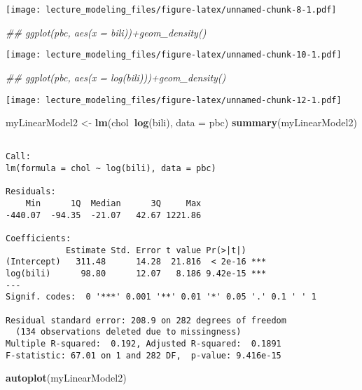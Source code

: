 \documentclass[12pt,letterpaperpaper,openany]{book}
\newenvironment{Shaded}{\begin{snugshade}}{\end{snugshade}}
\newcommand{\CommentTok}[1]{\textcolor[rgb]{0.56,0.35,0.01}{\textit{#1}}}
\newcommand{\DataTypeTok}[1]{\textcolor[rgb]{0.13,0.29,0.53}{#1}}
\newcommand{\KeywordTok}[1]{\textcolor[rgb]{0.13,0.29,0.53}{\textbf{#1}}}
\newcommand{\NormalTok}[1]{#1}
\newcommand{\OperatorTok}[1]{\textcolor[rgb]{0.81,0.36,0.00}{\textbf{#1}}}
\newcommand{\StringTok}[1]{\textcolor[rgb]{0.31,0.60,0.02}{#1}}
\begin{document}
\texttt{[image: lecture\_modeling\_files/figure-latex/unnamed-chunk-8-1.pdf]}

\begin{Shaded}
\begin{Highlighting}[]
\CommentTok{## ggplot(pbc, aes(x = bili))+geom_density()}
\end{Highlighting}
\end{Shaded}

\texttt{[image: lecture\_modeling\_files/figure-latex/unnamed-chunk-10-1.pdf]}

\begin{Shaded}
\begin{Highlighting}[]
\CommentTok{## ggplot(pbc, aes(x = log(bili)))+geom_density()}
\end{Highlighting}
\end{Shaded}

\texttt{[image: lecture\_modeling\_files/figure-latex/unnamed-chunk-12-1.pdf]}

\begin{Shaded}
\begin{Highlighting}[]
\NormalTok{myLinearModel2 <-}\StringTok{ }\KeywordTok{lm}\NormalTok{(chol}\OperatorTok{~}\KeywordTok{log}\NormalTok{(bili), }\DataTypeTok{data =}\NormalTok{ pbc)}
\KeywordTok{summary}\NormalTok{(myLinearModel2)}
\end{Highlighting}
\end{Shaded}

\begin{verbatim}

Call:
lm(formula = chol ~ log(bili), data = pbc)

Residuals:
    Min      1Q  Median      3Q     Max 
-440.07  -94.35  -21.07   42.67 1221.86 

Coefficients:
            Estimate Std. Error t value Pr(>|t|)    
(Intercept)   311.48      14.28  21.816  < 2e-16 ***
log(bili)      98.80      12.07   8.186 9.42e-15 ***
---
Signif. codes:  0 '***' 0.001 '**' 0.01 '*' 0.05 '.' 0.1 ' ' 1

Residual standard error: 208.9 on 282 degrees of freedom
  (134 observations deleted due to missingness)
Multiple R-squared:  0.192, Adjusted R-squared:  0.1891 
F-statistic: 67.01 on 1 and 282 DF,  p-value: 9.416e-15
\end{verbatim}

\begin{Shaded}
\begin{Highlighting}[]
\KeywordTok{autoplot}\NormalTok{(myLinearModel2)}
\end{Highlighting}
\end{Shaded}
\end{document}

